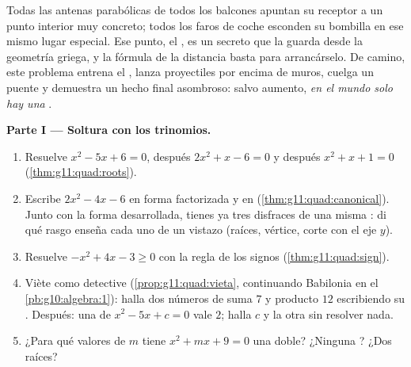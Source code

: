 \begin{problem}
\label{pb:g11:quad:1}
Todas las antenas parabólicas de todos los balcones apuntan su receptor a
un punto interior muy concreto; todos los faros de coche esconden su
bombilla en ese mismo lugar especial. Ese punto, el \emph{}, es un
secreto que la  guarda desde la geometría griega, y la fórmula de
la distancia basta para arrancárselo. De camino, este problema entrena el
, lanza proyectiles por encima de muros, cuelga un puente y
demuestra un hecho final asombroso: salvo aumento, \emph{en el mundo solo
hay una }.

\medskip
\noindent\textbf{Parte I --- Soltura con los trinomios.}
\begin{enumerate}
  \item Resuelve $x^2 - 5x + 6 = 0$, después $2x^2 + x - 6 = 0$ y después
        $x^2 + x + 1 = 0$ (\cref{thm:g11:quad:roots}).
  \item Escribe $2x^2 - 4x - 6$ en forma factorizada y en 
        (\cref{thm:g11:quad:canonical}). Junto con la forma desarrollada,
        tienes ya tres disfraces de una misma : di qué rasgo enseña
        cada uno de un vistazo (raíces, vértice, corte con el eje $y$).
  \item Resuelve $-x^2 + 4x - 3 \geq 0$ con la regla de los signos
        (\cref{thm:g11:quad:sign}).
  \item Viète como detective (\cref{prop:g11:quad:vieta}, continuando
        Babilonia en el \cref{pb:g10:algebra:1}): halla dos números de
        suma $7$ y producto $12$ escribiendo su . Después: una
         de $x^2 - 5x + c = 0$ vale $2$; halla $c$ y la otra  sin
        resolver nada.
  \item ¿Para qué valores de $m$ tiene $x^2 + mx + 9 = 0$ una  doble?
        ¿Ninguna ? ¿Dos raíces?
\end{enumerate}


\end{problem}
